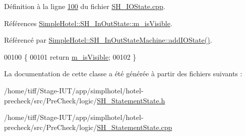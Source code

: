 Définition à la ligne \hyperlink{SH__IOState_8cpp_source_l00100}{100} du fichier \hyperlink{SH__IOState_8cpp_source}{S\-H\-\_\-\-I\-O\-State.\-cpp}.



Références \hyperlink{classSimpleHotel_1_1SH__InOutState_a041ad53f3cdfb1b18ee002597e833848}{Simple\-Hotel\-::\-S\-H\-\_\-\-In\-Out\-State\-::m\-\_\-is\-Visible}.



Référencé par \hyperlink{classSimpleHotel_1_1SH__InOutStateMachine_a07ae9f1f74a9a41b26e77a014679a33e}{Simple\-Hotel\-::\-S\-H\-\_\-\-In\-Out\-State\-Machine\-::add\-I\-O\-State()}.


\begin{DoxyCode}
00100                                \{
00101     \textcolor{keywordflow}{return} \hyperlink{classSimpleHotel_1_1SH__InOutState_a041ad53f3cdfb1b18ee002597e833848}{m\_isVisible};
00102 \}
\end{DoxyCode}


La documentation de cette classe a été générée à partir des fichiers suivants \-:\begin{DoxyCompactItemize}
\item 
/home/tiff/\-Stage-\/\-I\-U\-T/app/simplhotel/hotel-\/precheck/src/\-Pre\-Check/logic/\hyperlink{SH__StatementState_8h}{S\-H\-\_\-\-Statement\-State.\-h}\item 
/home/tiff/\-Stage-\/\-I\-U\-T/app/simplhotel/hotel-\/precheck/src/\-Pre\-Check/logic/\hyperlink{SH__StatementState_8cpp}{S\-H\-\_\-\-Statement\-State.\-cpp}\end{DoxyCompactItemize}

